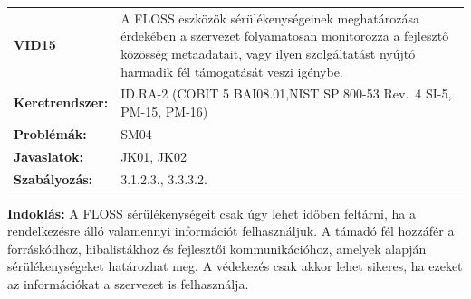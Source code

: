 \documentclass[12pt,magyar,a4paper,oneside]{scrreprt}
\begin{document}
\begin{longtable}[]{@{}ll@{}}
\toprule
\endhead
\begin{minipage}[t]{0.16\columnwidth}\raggedright
\textbf{VID15}\strut
\end{minipage} & \begin{minipage}[t]{0.79\columnwidth}\raggedright
A FLOSS eszközök sérülékenységeinek meghatározása érdekében a szervezet
folyamatosan monitorozza a fejlesztő közösség metaadatait, vagy ilyen
szolgáltatást nyújtó harmadik fél támogatását veszi igénybe.\strut
\end{minipage}\tabularnewline
\begin{minipage}[t]{0.16\columnwidth}\raggedright
\textbf{Keretrendszer:}\strut
\end{minipage} & \begin{minipage}[t]{0.79\columnwidth}\raggedright
ID.RA-2 (COBIT 5 BAI08.01,NIST SP 800-53 Rev.~4 SI-5, PM-15,
PM-16)\strut
\end{minipage}\tabularnewline
\begin{minipage}[t]{0.16\columnwidth}\raggedright
\textbf{Problémák:}\strut
\end{minipage} & \begin{minipage}[t]{0.79\columnwidth}\raggedright
SM04\strut
\end{minipage}\tabularnewline
\begin{minipage}[t]{0.16\columnwidth}\raggedright
\textbf{Javaslatok:}\strut
\end{minipage} & \begin{minipage}[t]{0.79\columnwidth}\raggedright
JK01, JK02\strut
\end{minipage}\tabularnewline
\begin{minipage}[t]{0.16\columnwidth}\raggedright
\textbf{Szabályozás:}\strut
\end{minipage} & \begin{minipage}[t]{0.79\columnwidth}\raggedright
3.1.2.3., 3.3.3.2.\strut
\end{minipage}\tabularnewline
\bottomrule
\end{longtable}

\textbf{Indoklás: } A FLOSS sérülékenységeit csak úgy lehet időben
feltárni, ha a rendelkezésre álló valamennyi információt felhasználjuk.
A támadó fél hozzáfér a forráskódhoz, hibalistákhoz és fejlesztői
kommunikációhoz, amelyek alapján sérülékenységeket határozhat meg. A
védekezés csak akkor lehet sikeres, ha ezeket az információkat a
szervezet is felhasználja.
\end{document}
